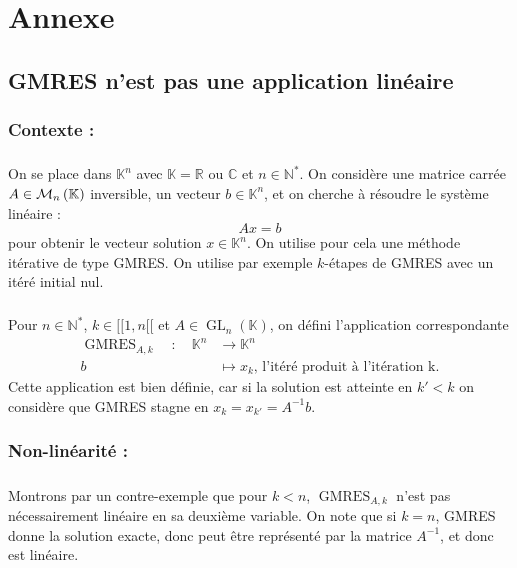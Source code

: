 \newcommand{\D}{\vphantom{\ddots}}
\renewcommand{\thesection}{\Alph{section}}

\chapter*{Annexe}
\section{GMRES n'est pas une application linéaire}\label{annexe:gmres_non-linear}

\subsection*{Contexte :}
  \paragraph{}
  On se place dans $\mathbb{K}^n$ avec $\mathbb{K} = \mathbb{R}\textrm{ ou }\mathbb{C}$ et $n \in \mathbb{N^*}$.
  On considère une matrice carrée $A\in\mathcal{M}_{n}\left(\mathbb{K}\right)$ inversible, un vecteur $b\in\mathbb{K}^n$, et on cherche à résoudre le système linéaire :
  \[Ax = b\]
  pour obtenir le vecteur solution $x\in\mathbb{K}^n$.
  On utilise pour cela une méthode itérative de type GMRES.
  On utilise par exemple $k$-étapes de GMRES avec un itéré initial nul.

  \paragraph{}
  Pour $n \in \mathbb{N^*}$, $k \in [\![1, n[\![$ et $A\in\operatorname{GL}_n\left(\mathbb{K}\right)$, on défini l'application correspondante
  \begin{align*}
    \operatorname{GMRES}_{A, k}\quad : \quad \mathbb{K}^n &\to \mathbb{K}^n \\
    b \;&\mapsto x_k\textrm{, l'itéré produit à l'itération k.}
  \end{align*}
  Cette application est bien définie, car si la solution est atteinte en $k' < k$ on considère que GMRES stagne en $x_k = x_{k'} = A^{-1}b$.


\subsection*{Non-linéarité :}

  \paragraph{}
  Montrons par un contre-exemple que pour $k < n$, $\operatorname{GMRES}_{A, k}$ n'est pas nécessairement linéaire en sa deuxième variable.
  On note que si $k = n$, GMRES donne la solution exacte, donc peut être représenté par la matrice $A^{-1}$, et donc est linéaire.

